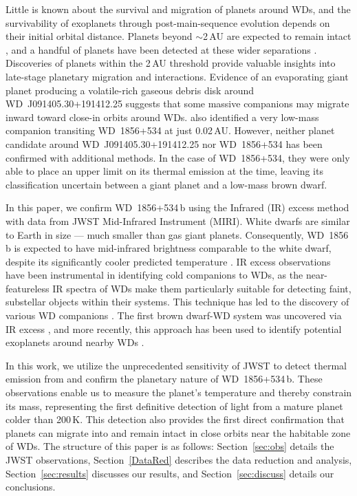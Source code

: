 \documentclass[twocolumn]{aastex631}
\begin{document}
Little is known about the survival and migration of planets around WDs, and the survivability of exoplanets through post-main-sequence evolution depends on their initial orbital distance. Planets beyond $\sim$2\,AU are expected to remain intact \citep{Nordhaus2013MNRAS}, and a handful of planets have been detected at these wider separations \citep{2011ApJ...730L...9L,1993ApJ...412L..33T,2003Sci...301..193S,2021Natur.598..272B,2024ApJ...962L..32M,2024NatAs...8.1575Z}.
Discoveries of planets within the 2\,AU threshold provide valuable insights into late-stage planetary migration and interactions. Evidence of an evaporating giant planet producing a volatile-rich gaseous debris disk \citep{2019Natur.576...61G} around WD~J091405.30+191412.25 suggests that some massive companions may migrate inward toward close-in orbits around WDs.  \citet{Vanderburg_2020} also identified a very low-mass companion transiting WD~1856+534 at just 0.02\,AU. However, neither planet candidate around WD~J091405.30+191412.25 nor WD~1856+534 has been confirmed with additional methods. In the case of WD~1856+534, they were only able to place an upper limit on its thermal emission at the time, leaving its classification uncertain between a giant planet and a low-mass brown dwarf.

In this paper, we confirm WD~1856+534\,b using the Infrared (IR) excess method with data from JWST Mid-Infrared Instrument (MIRI). White dwarfs are similar to Earth in size --- much smaller than gas giant planets. Consequently, WD~1856\,b is expected to have mid-infrared brightness comparable to the white dwarf, despite its significantly cooler predicted temperature \citep{Limbach22}.
IR excess observations have been instrumental in identifying cold companions to WDs, as the near-featureless IR spectra of WDs make them particularly suitable for detecting faint, substellar objects within their systems. This technique has led to the discovery of various WD companions \citep{2005ApJ...632L.115K,2005ApJ...632L.119B,2008ApJ...674..431F,2012ApJ...760...26B,2020ApJ...898L..35S,Limbach22}. The first brown dwarf-WD system was uncovered via IR excess \citep{1987Natur.330..138Z,2022Natur.602..219C}, and more recently, this approach has been used to identify potential exoplanets around nearby WDs \citep{2024ApJ...973L..11L}. 




In this work, we utilize the unprecedented sensitivity of JWST to detect thermal emission from and confirm the planetary nature of WD~1856+534\,b. These observations enable us to measure the planet's temperature and thereby constrain its mass, representing the first definitive detection of light from a mature planet colder than 200\,K. This detection also provides the first direct confirmation that planets can migrate into and remain intact in close orbits near the habitable zone of WDs. 
The structure of this paper is as follows: Section~\ref{sec:obs} details the JWST observations, Section~\ref{DataRed} describes the data reduction and analysis, Section~\ref{sec:results} discusses our results, and Section~\ref{sec:discuss} details our conclusions.
\end{document}
